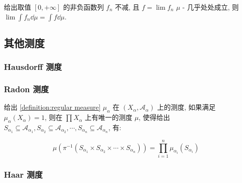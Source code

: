 \begin{theorem}[单调收敛定理]
    给出取值 \([0,+\infty]\) 的非负函数列 \(f_n\) 不减, 且 \(f = \lim f_n\) \(\mu\) - 几乎处处成立, 则 \(\lim \int f_n \dd \mu = \int f \dd \mu\).

\end{theorem}

\subsection{其他测度}

\subsubsection{Hausdorff 测度}
\subsubsection{Radon 测度}

\begin{definition}[Radon 测度]
    \label {definition:Radon measure}
    给出 \ref{definition:regular measure} \(\mu_\alpha\) 在 \((X_\alpha,\mathcal{A}_\alpha)\) 上的测度,
    如果满足 \(\mu_\alpha(X_\alpha) = 1\), 则在 \(\prod X_\alpha\) 上有唯一的测度 \(\mu\), 使得给出 \(S_{\alpha_1} \subseteq \mathcal{A}_{\alpha_1}, S_{\alpha_2} \subseteq \mathcal{A}_{\alpha_2}, \cdots, S_{\alpha_n} \subseteq \mathcal{A}_{\alpha_n}\), 有:

    \[
        \mu(\pi^{-1} (S_{\alpha_1} \times S_{\alpha_2} \times \cdots \times S_{\alpha_n})) = \prod_{i=1}^{n} \mu_{\alpha_i} (S_{\alpha_i})
    \]
\end{definition}

\subsubsection{Haar 测度}

